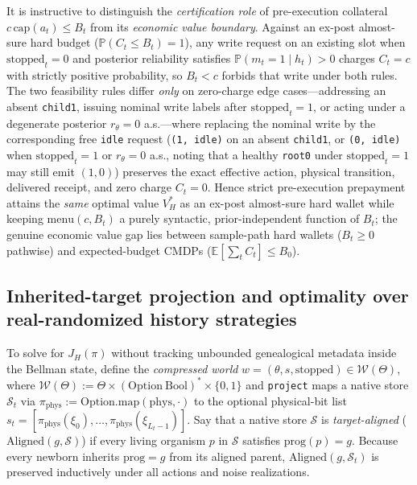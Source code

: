 \documentclass[11pt,letterpaper]{article}
\begin{document}
It is instructive to distinguish the \emph{certification role} of
pre-execution collateral \(c\,\mathrm{cap}(a_t) \le B_t\) from its
\emph{economic value boundary}. Against an ex-post almost-sure hard
budget (\(\mathbb{P}(C_t \le B_t) = 1\)), any write request on an
existing slot when \(\mathrm{stopped}_t = 0\) and posterior reliability
satisfies \(\mathbb{P}(m_t = 1 \mid h_t) > 0\) charges \(C_t = c\) with
strictly positive probability, so \(B_t < c\) forbids that write under
both rules. The two feasibility rules differ \emph{only} on zero-charge
edge cases---addressing an absent \texttt{child1}, issuing nominal write
labels after \(\mathrm{stopped}_t = 1\), or acting under a degenerate
posterior \(r_\theta = 0\) a.s.---where replacing the nominal write by
the corresponding free \texttt{idle} request (\texttt{(1,\ idle)} on an
absent \texttt{child1}, or \texttt{(0,\ idle)} when
\(\mathrm{stopped}_t = 1\) or \(r_\theta = 0\) a.s., noting that a
healthy \texttt{root0} under \(\mathrm{stopped}_t = 1\) may still emit
\((1,0)\)) preserves the exact effective action, physical transition,
delivered receipt, and zero charge \(C_t = 0\). Hence strict
pre-execution prepayment attains the \emph{same} optimal value \(V_H^*\)
as an ex-post almost-sure hard wallet while keeping
\(\mathrm{menu}(c, B_t)\) a purely syntactic, prior-independent function
of \(B_t\); the genuine economic value gap lies between sample-path hard
wallets (\(B_t \ge 0\) pathwise) and expected-budget CMDPs
(\(\mathbb{E}[\sum_t C_t] \le B_0\)).

\subsection{Inherited-target projection and optimality over
real-randomized history
strategies}\label{inherited-target-projection-and-optimality-over-real-randomized-history-strategies}

To solve for \(J_H(\pi)\) without tracking unbounded genealogical
metadata inside the Bellman state, define the \emph{compressed world}
\(w = (\theta, s, \mathrm{stopped}) \in \mathcal{W}(\Theta)\), where
\(\mathcal{W}(\Theta) := \Theta \times (\mathrm{Option\ Bool})^* \times \{0,1\}\)
and \texttt{project} maps a native store \(\mathcal{S}_t\) via
\(\pi_{\mathrm{phys}} := \mathrm{Option.map}(\mathrm{phys}, \cdot)\) to
the optional physical-bit list
\(s_t = [\pi_{\mathrm{phys}}(\xi_0), \dots, \pi_{\mathrm{phys}}(\xi_{L_t-1})]\).
Say that a native store \(\mathcal{S}\) is \emph{target-aligned}
(\(\mathrm{Aligned}(g, \mathcal{S})\)) if every living organism \(p\) in
\(\mathcal{S}\) satisfies \(\mathrm{prog}(p) = g\). Because every
newborn inherits \(\mathrm{prog} = g\) from its aligned parent,
\(\mathrm{Aligned}(g, \mathcal{S}_t)\) is preserved inductively under
all actions and noise realizations.
\end{document}
